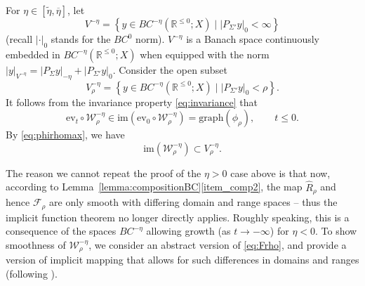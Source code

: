 \documentclass[a4paper, 12pt, oneside, reqno, notitlepage]{amsart}
\theoremstyle{plain}
\theoremstyle{definition}
\theoremstyle{remark}
\newcommand{\im}{\mathrm{im}}
\newcommand{\gr}{\mathrm{graph}}
\begin{document}
For $\eta \in [\widetilde{\eta},\overline{\eta}]$, let
\begin{displaymath}
    V^{-\eta} = \left\{ y \in BC^{-\eta}(\mathbb{R}^{\leq 0} ; X) \; \big| \; |P_{\Sigma'}y|_0 < \infty \right\}
\end{displaymath}
(recall $| \cdot |_0$ stands for the $BC^0$ norm).
$V^{-\eta}$ is a Banach space continuously embedded in $BC^{-\eta}(\mathbb{R}^{\leq 0} ; X)$ when equipped with the norm $|y|_{V^{-\eta}} = |P_\Sigma y|_{-\eta} + |P_{\Sigma'}y|_0$.
Consider the open subset
\begin{displaymath}
    V^{-\eta}_\rho = \left\{ y \in BC^{-\eta}(\mathbb{R}^{\leq 0} ; X) \; \big| \; |P_{\Sigma'}y|_0 < \rho \right\}.
\end{displaymath}
It follows from the invariance property \eqref{eq:invariance} that
\begin{displaymath}
    \mathrm{ev}_t \circ \mathcal{W}^{-\eta}_\rho \in \im \left( \mathrm{ev}_0 \circ \mathcal{W}_\rho^{-\eta} \right) = \gr(\phi_\rho), \qquad t \leq 0. 
\end{displaymath}
By \eqref{eq:phirhomax}, we have
\begin{equation}
    \im \left( \mathcal{W}_\rho^{-\eta}\right) \subset V^{-\eta}_\rho.
    \label{eq:image_contained_in_O0}
\end{equation}





The reason we cannot repeat the proof of the $\eta > 0$ case above is that now, according to Lemma~\ref{lemma:compositionBC}\ref{item_comp2}, the map $\widehat{R}_\rho$ and hence $\mathcal{F}_\rho$ are only smooth with differing domain and range spaces -- thus the implicit function theorem no longer directly applies.
Roughly speaking, this is a consequence of the spaces $BC^{-\eta}$ allowing growth (as $t \to -\infty$) for $\eta < 0$.
To show smoothness of $\mathcal{W}_\rho^{-\eta}$, we consider an abstract version of \eqref{eq:Frho}, and provide a version of implicit mapping that allows for such differences in domains and ranges (following \cite{vanderbauwhede1987center,diekmann2012delay}).
\end{document}
